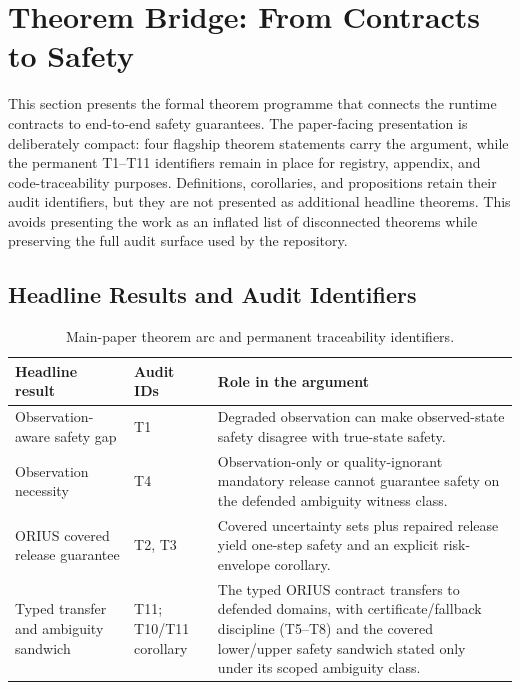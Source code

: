 \section{Theorem Bridge: From Contracts to Safety}\label{sec:theory}

This section presents the formal theorem programme that connects the \dcs{} runtime
contracts to end-to-end safety guarantees.  The paper-facing presentation is
deliberately compact: four flagship theorem statements carry the argument, while
the permanent T1--T11 identifiers remain in place for registry, appendix, and
code-traceability purposes.  Definitions, corollaries, and propositions retain
their audit identifiers, but they are not presented as additional headline
theorems.  This avoids presenting the work as an inflated list of disconnected
theorems while preserving the full audit surface used by the repository.

\subsection{Headline Results and Audit Identifiers}\label{sec:headline-theorem-arc}

\begin{table}[h]
\caption{Main-paper theorem arc and permanent traceability identifiers.}
\label{tab:headline_theorem_arc}
\centering\small
\begin{tabularx}{\columnwidth}{@{}p{}p{}X@{}}
\toprule
\textbf{Headline result} & \textbf{Audit IDs} & \textbf{Role in the argument}\\
\midrule
Observation-aware safety gap & T1 & Degraded observation can make observed-state safety disagree with true-state safety.\\
Observation necessity & T4 & Observation-only or quality-ignorant mandatory release cannot guarantee safety on the defended ambiguity witness class.\\
ORIUS covered release guarantee & T2, T3 & Covered uncertainty sets plus repaired release yield one-step safety and an explicit risk-envelope corollary.\\
Typed transfer and ambiguity sandwich & T11; T10/T11 corollary & The typed ORIUS contract transfers to defended domains, with certificate/fallback discipline (T5--T8) and the covered lower/upper safety sandwich stated only under its scoped ambiguity class.\\
\bottomrule
\end{tabularx}
\end{table}

